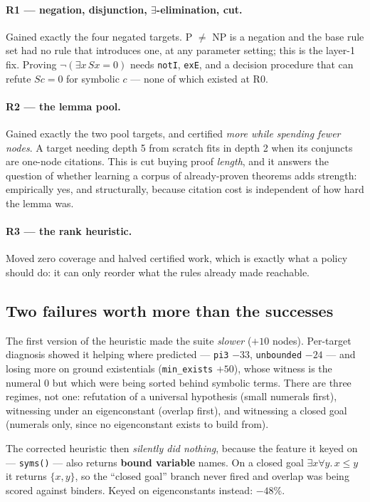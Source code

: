 \documentclass[11pt,a4paper]{article}
\begin{document}
\paragraph{R1 --- negation, disjunction, $\exists$-elimination, cut.} Gained
exactly the four negated targets. P $\neq$ NP is a negation and the base rule
set had no rule that introduces one, at any parameter setting; this is the
layer-1 fix. Proving $\lnot(\exists x\, Sx = 0)$ needs \texttt{notI},
\texttt{exE}, and a decision procedure that can refute $Sc = 0$ for symbolic
$c$ --- none of which existed at R0.

\paragraph{R2 --- the lemma pool.} Gained exactly the two pool targets, and
certified \emph{more while spending fewer nodes}. A target needing depth 5 from
scratch fits in depth 2 when its conjuncts are one-node citations. This is cut
buying proof \emph{length}, and it answers the question of whether learning a
corpus of already-proven theorems adds strength: empirically yes, and
structurally, because citation cost is independent of how hard the lemma was.

\paragraph{R3 --- the rank heuristic.} Moved zero coverage and halved certified
work, which is exactly what a policy should do: it can only reorder what the
rules already made reachable.

\subsection{Two failures worth more than the successes}

The first version of the heuristic made the suite \emph{slower} ($+10$ nodes).
Per-target diagnosis showed it helping where predicted --- \texttt{pi3} $-33$,
\texttt{unbounded} $-24$ --- and losing more on ground existentials
(\texttt{min\_exists} $+50$), whose witness is the numeral $0$ but which were
being sorted behind symbolic terms. There are three regimes, not one:
refutation of a universal hypothesis (small numerals first), witnessing under an
eigenconstant (overlap first), and witnessing a closed goal (numerals only,
since no eigenconstant exists to build from).

The corrected heuristic then \emph{silently did nothing}, because the feature it
keyed on --- \texttt{syms()} --- also returns \textbf{bound variable} names. On a
closed goal $\exists x \forall y.\, x \le y$ it returns $\{x,y\}$, so the
``closed goal'' branch never fired and overlap was being scored against
binders. Keyed on eigenconstants instead: $-48\%$.
\end{document}
